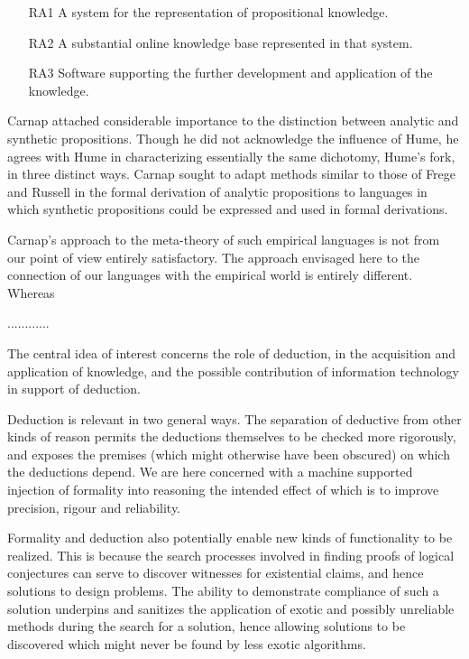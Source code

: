 \begin{itemize}
\item[RA1] A system for the representation of propositional knowledge.
\item[RA2] A substantial online knowledge base represented in that system.
\item[RA3] Software supporting the further development and application of the knowledge.
\end{itemize}

Carnap attached considerable importance to the distinction between
analytic and synthetic propositions.
Though he did not acknowledge the influence of Hume, he agrees with
Hume in characterizing essentially the same dichotomy, Hume's fork, in three
distinct ways.
Carnap sought to adapt methods similar to those of Frege and Russell
in the formal derivation of analytic propositions to languages in
which synthetic propositions could be expressed and used in formal
derivations.

Carnap's approach to the meta-theory of such empirical languages is not
from our point of view entirely satisfactory.
The approach envisaged here to the connection of our languages with
the empirical world is entirely different.
Whereas 

............

The central idea of interest concerns the role of deduction, in the
acquisition and application of knowledge, and the possible
contribution of information technology in support of deduction.

Deduction is relevant in two general ways.
The separation of deductive from other kinds of reason permits the
deductions themselves to be checked more rigorously, and exposes the
premises (which might otherwise have been obscured) on which the
deductions depend.
We are here concerned with a machine supported injection of formality
into reasoning the intended effect of which is to improve precision,
rigour and reliability.

Formality and deduction also potentially enable new kinds of
functionality to be realized.
This is because the search processes involved in finding proofs of
logical conjectures can serve to discover witnesses for existential
claims, and hence solutions to design problems.
The ability to demonstrate compliance of such a solution underpins
and sanitizes the application of exotic and possibly unreliable
methods during the search for a solution, hence allowing solutions to
be discovered which might never be found by less exotic algorithms.

